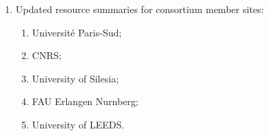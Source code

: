 \begin{enumerate}
\begin{enumerate}
\item Updated resource summaries for consortium member sites:
\begin{enumerate}
\item Université Paris-Sud;
\item CNRS;
\item University of Silesia;
\item FAU Erlangen Nurnberg;
\item University of LEEDS.
\end{enumerate}
\end{enumerate}
\end{enumerate}
\clearpage
\setcounter{page}{1}
